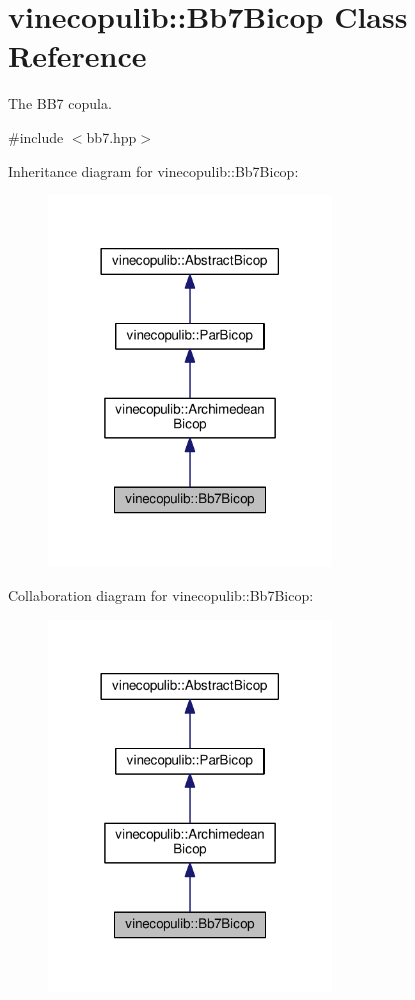 \hypertarget{classvinecopulib_1_1_bb7_bicop}{}\section{vinecopulib\+:\+:Bb7\+Bicop Class Reference}
\label{classvinecopulib_1_1_bb7_bicop}


The B\+B7 copula.  




{\ttfamily \#include $<$bb7.\+hpp$>$}



Inheritance diagram for vinecopulib\+:\+:Bb7\+Bicop\+:
\nopagebreak
\begin{figure}[H]
\begin{center}
\leavevmode
\includegraphics[width=213pt]{classvinecopulib_1_1_bb7_bicop__inherit__graph}
\end{center}
\end{figure}


Collaboration diagram for vinecopulib\+:\+:Bb7\+Bicop\+:
\nopagebreak
\begin{figure}[H]
\begin{center}
\leavevmode
\includegraphics[width=213pt]{classvinecopulib_1_1_bb7_bicop__coll__graph}
\end{center}
\end{figure}
